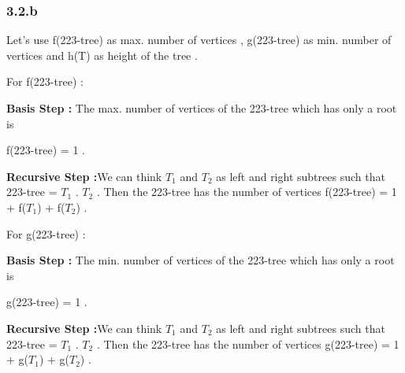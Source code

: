 \documentclass[12pt]{article}
\begin{document}
\subsubsection*{3.2.b}
\hspace{15px} Let's use f(223-tree) as max. number of vertices , g(223-tree) as min. number of vertices and h(T) as height of the tree .\\ \par 
For f(223-tree) : \par 
\textbf{Basis Step :} The max. number of vertices of the 223-tree which has only a root is \par  f(223-tree) = 1 .\par 
\textbf{Recursive Step :}We can think \textit{$T_1$} and \textit{$T_2$} as left and right subtrees such that 223-tree = \textit{$T_1$} . \textit{$T_2$} . Then the 223-tree has the number of vertices f(223-tree) = 1 + f(\textit{$T_1$}) + f(\textit{$T_2$}) . \\ \par 
For g(223-tree) : \par 
\textbf{Basis Step :} The min. number of vertices of the 223-tree which has only a root is \par  g(223-tree) = 1 .\par 
\textbf{Recursive Step :}We can think \textit{$T_1$} and \textit{$T_2$} as left and right subtrees such that 223-tree = \textit{$T_1$} . \textit{$T_2$} . Then the 223-tree has the number of vertices g(223-tree) = 1 + g(\textit{$T_1$}) + g(\textit{$T_2$}) .
\end{document}

